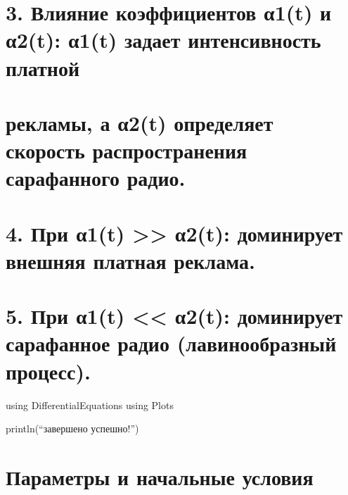 \documentclass[
  english,
  russian,
  12pt,
  a4paper,
  DIV=11,
  numbers=noendperiod]{scrreprt}
\begin{document}
\chapter{3. Влияние коэффициентов α1(t) и α2(t): α1(t) задает
интенсивность
платной}\label{ux432ux43bux438ux44fux43dux438ux435-ux43aux43eux44dux444ux444ux438ux446ux438ux435ux43dux442ux43eux432-ux3b11t-ux438-ux3b12t-ux3b11t-ux437ux430ux434ux430ux435ux442-ux438ux43dux442ux435ux43dux441ux438ux432ux43dux43eux441ux442ux44c-ux43fux43bux430ux442ux43dux43eux439}

\chapter{рекламы, а α2(t) определяет скорость распространения
сарафанного
радио.}\label{ux440ux435ux43aux43bux430ux43cux44b-ux430-ux3b12t-ux43eux43fux440ux435ux434ux435ux43bux44fux435ux442-ux441ux43aux43eux440ux43eux441ux442ux44c-ux440ux430ux441ux43fux440ux43eux441ux442ux440ux430ux43dux435ux43dux438ux44f-ux441ux430ux440ux430ux444ux430ux43dux43dux43eux433ux43e-ux440ux430ux434ux438ux43e.}

\chapter{4. При α1(t) \textgreater\textgreater{} α2(t): доминирует
внешняя платная
реклама.}\label{ux43fux440ux438-ux3b11t-ux3b12t-ux434ux43eux43cux438ux43dux438ux440ux443ux435ux442-ux432ux43dux435ux448ux43dux44fux44f-ux43fux43bux430ux442ux43dux430ux44f-ux440ux435ux43aux43bux430ux43cux430.}

\chapter{5. При α1(t) \textless\textless{} α2(t): доминирует сарафанное
радио (лавинообразный
процесс).}\label{ux43fux440ux438-ux3b11t-ux3b12t-ux434ux43eux43cux438ux43dux438ux440ux443ux435ux442-ux441ux430ux440ux430ux444ux430ux43dux43dux43eux435-ux440ux430ux434ux438ux43e-ux43bux430ux432ux438ux43dux43eux43eux431ux440ux430ux437ux43dux44bux439-ux43fux440ux43eux446ux435ux441ux441.}

using DifferentialEquations using Plots

println(\enquote{ завершено успешно!})

\chapter{Параметры и начальные
условия}\label{ux43fux430ux440ux430ux43cux435ux442ux440ux44b-ux438-ux43dux430ux447ux430ux43bux44cux43dux44bux435-ux443ux441ux43bux43eux432ux438ux44f}
\end{document}
